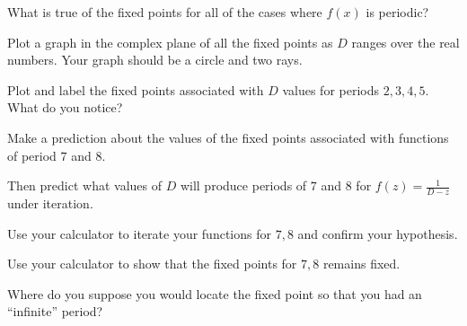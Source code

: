 \documentclass[../gatm_answers.tex]{subfiles}
\begin{document}
\begin{inner_problem}
\item What is true of the fixed points for all of the cases where $f(x)$ is periodic?
\end{inner_problem}

\begin{outer_problem}
\item
\end{outer_problem}

\begin{inner_problem}[start=1]
\item Plot a graph in the complex plane of all the fixed points as $D$ ranges over the real numbers. Your graph should be a circle and two rays.
\end{inner_problem}

\begin{inner_problem}
\item Plot and label the fixed points associated with $D$ values for periods $2,3,4,5$. What do you notice?
\end{inner_problem}

\begin{inner_problem}
\item Make a prediction about the values of the fixed points associated with functions of period $7$ and $8$.
\end{inner_problem}

\begin{inner_problem}
\item Then predict what values of $D$ will produce periods of $7$ and $8$ for $f(z)=\frac{1}{D-z}$ under iteration.
\end{inner_problem}

\begin{inner_problem}
\item Use your calculator to iterate your functions for $7,8$ and confirm your hypothesis.
\end{inner_problem}

\begin{inner_problem}
\item Use your calculator to show that the fixed points for $7,8$ remains fixed.
\end{inner_problem}

\begin{inner_problem}
\item Where do you suppose you would locate the fixed point so that you had an ``infinite'' period?
\end{inner_problem}
\end{document}
